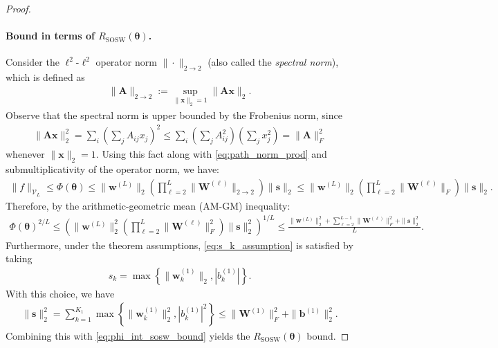 \documentclass{article}
\def\vtheta{{\bm{\theta}}}
\def\vb{{\bm{b}}}
\def\vs{{\bm{s}}}
\def\vw{{\bm{w}}}
\def\vx{{\bm{x}}}
\def\mA{{\bm{A}}}
\def\mW{{\bm{W}}}
\def\cV{{\mathcal{V}}}
\begin{document}
\begin{appendices}
\begin{proof}
\paragraph{Bound in terms of $R_{\mathrm{SOSW}} (\vtheta)$.}
    Consider the $\ell^2$-$\ell^2$ operator norm $\| \cdot \|_{2 \to 2}$ (also called the \textit{spectral norm}), which is defined as
    \begin{align}
        \| \mA \|_{2 \to 2} := \sup_{\| \vx \|_2=1} \| \mA \vx \|_2.
    \end{align}
    Observe that the spectral norm is upper bounded by the Frobenius norm, since
    \begin{align}
        \| \mA \vx \|_2^2 = \sum_i \left( \sum_j A_{ij} x_j \right)^2 \leq \sum_i \left( \sum_j A_{ij}^2 \right) \left( \sum_j x_j^2 \right) = \| \mA \|_F^2
    \end{align}
    whenever $\| \vx \|_2 = 1$. Using this fact along with \eqref{eq:path_norm_prod} and submultiplicativity of the operator norm, we have:
    \begin{align}
        \| f \|_{\cV_L} \leq \Phi(\vtheta) \leq \| \vw^{(L)} \|_2 \left( \prod_{\ell=2}^L \| \mW^{(\ell)} \|_{2 \to 2} \right) \| \vs \|_2 \leq \| \vw^{(L)} \|_2 \left( \prod_{\ell=2}^L \| \mW^{(\ell)} \|_{F} \right) \| \vs \|_2. 
    \end{align}
    Therefore, by the arithmetic-geometric mean (AM-GM) inequality:
    \begin{align} \label{eq:phi_int_sosw_bound}
        \Phi(\vtheta)^{2/L} \leq \left( \| \vw^{(L)} \|_2^2 \left( \prod_{\ell=2}^L \| \mW^{(\ell)} \|_{F}^2 \right) \| \vs \|_2^2 \right)^{1/L} \leq \frac{\| \vw^{(L)} \|_2^2 + \sum_{\ell=2}^{L-1} \| \mW^{(\ell)} \|_F^2 + \| \vs \|_2^2 }{L}.
    \end{align}
    Furthermore, under the theorem assumptions, \eqref{eq:s_k_assumption} is  satisfied by taking
    \begin{align} \label{eq:s_k_choice_equiv_proof}
        s_k = \max \left\{ \| \vw_k^{(1)} \|_2, |b_k^{(1)}| \right\}.
    \end{align}
    With this choice, we have
    \begin{align}
        \| \vs \|_2^2 = \sum_{k=1}^{K_1} \max \left\{ \| \vw_k^{(1)} \|_2^2, |b_k^{(1)}|^2 \right\} \leq \| \mW^{(1)} \|_F^2 + \| \vb^{(1)} \|_2^2.
    \end{align}
    Combining this with \eqref{eq:phi_int_sosw_bound} yields the $R_{\mathrm{SOSW}} (\vtheta)$ bound.


\end{proof}
\end{appendices}
\end{document}
